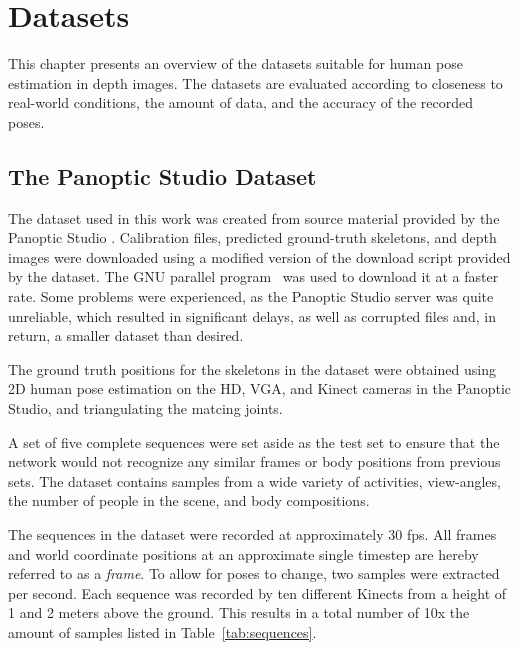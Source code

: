 \chapter{Datasets}

This chapter presents an overview of the datasets suitable for human pose estimation in depth images. The datasets are evaluated according to closeness to real-world conditions, the amount of data, and the accuracy of the recorded poses.


\section{The Panoptic Studio Dataset}

The dataset used in this work was created from source material provided by the Panoptic Studio \cite{Joo_2015_ICCV, Joo_2017_TPAMI}. Calibration files, predicted ground-truth skeletons, and depth images were downloaded using a modified version of the download script provided by the dataset. The GNU parallel program~\cite{Tange2011a} was used to download it at a faster rate. Some problems were experienced, as the Panoptic Studio server was quite unreliable, which resulted in significant delays, as well as corrupted files and, in return, a smaller dataset than desired.

The ground truth positions for the skeletons in the dataset were obtained using 2D human pose estimation on the HD, VGA, and Kinect cameras in the Panoptic Studio, and triangulating the matcing joints.

A set of five complete sequences were set aside as the test set to ensure that the network would not recognize any similar frames or body positions from previous sets. The dataset contains samples from a wide variety of activities, view-angles, the number of people in the scene, and body compositions.

The sequences in the dataset were recorded at approximately 30 fps. All frames and world coordinate positions at an approximate single timestep are hereby referred to as a \emph{frame}. To allow for poses to change, two samples were extracted per second. Each sequence was recorded by ten different Kinects from a height of 1 and 2 meters above the ground. This results in a total number of 10x the amount of samples listed in Table~\ref{tab:sequences}.

